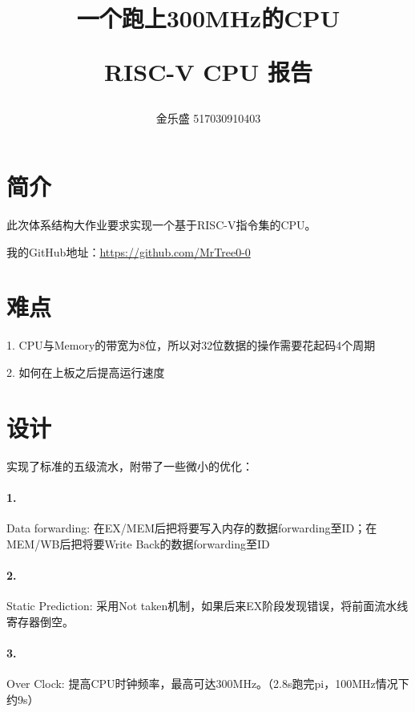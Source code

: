 \documentclass[a4paper,10pt,oneside]{article}
\begin{document}
\title{一个跑上300MHz的CPU\\[2ex]\begin{large} RISC-V CPU 报告\end{large}}
\author{金乐盛 517030910403}
\maketitle

\section{简介}
此次体系结构大作业要求实现一个基于RISC-V指令集的CPU。

我的GitHub地址：\url{https://github.com/MrTree0-0}

\section{难点}
1. CPU与Memory的带宽为8位，所以对32位数据的操作需要花起码4个周期

2. 如何在上板之后提高运行速度

\section{设计}
实现了标准的五级流水，附带了一些微小的优化：
\paragraph{1.} Data forwarding: 在EX/MEM后把将要写入内存的数据forwarding至ID；在MEM/WB后把将要Write Back的数据forwarding至ID

\paragraph{2.} Static Prediction: 采用Not taken机制，如果后来EX阶段发现错误，将前面流水线寄存器倒空。

\paragraph{3.} Over Clock: 提高CPU时钟频率，最高可达300MHz。（2.8s跑完pi，100MHz情况下约9s）
\end{document}
